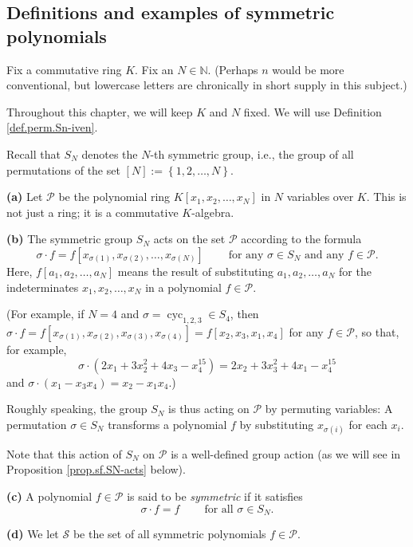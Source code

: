 \subsection{\label{sec.sf.sp}Definitions and examples of symmetric
polynomials}

\begin{convention}
\label{conv.sf.KN}Fix a commutative ring $K$. Fix an $N\in\mathbb{N}$.
(Perhaps $n$ would be more conventional, but lowercase letters are chronically
in short supply in this subject.)

Throughout this chapter, we will keep $K$ and $N$ fixed. We will use
Definition \ref{def.perm.Sn-iven}.
\end{convention}

Recall that $S_{N}$ denotes the $N$-th symmetric group, i.e., the group of all
permutations of the set $\left[  N\right]  :=\left\{  1,2,\ldots,N\right\}  $.

\begin{definition}
\label{def.sf.PS}\textbf{(a)} Let $\mathcal{P}$ be the polynomial ring
$K\left[  x_{1},x_{2},\ldots,x_{N}\right]  $ in $N$ variables over $K$. This
is not just a ring; it is a commutative $K$-algebra. \medskip

\textbf{(b)} The symmetric group $S_{N}$ acts on the set $\mathcal{P}$
according to the formula%
\[
\sigma\cdot f=f\left[  x_{\sigma\left(  1\right)  },x_{\sigma\left(  2\right)
},\ldots,x_{\sigma\left(  N\right)  }\right]  \ \ \ \ \ \ \ \ \ \ \text{for
any }\sigma\in S_{N}\text{ and any }f\in\mathcal{P}.
\]
Here, $f\left[  a_{1},a_{2},\ldots,a_{N}\right]  $ means the result of
substituting $a_{1},a_{2},\ldots,a_{N}$ for the indeterminates $x_{1}%
,x_{2},\ldots,x_{N}$ in a polynomial $f\in\mathcal{P}$.

(For example, if $N=4$ and $\sigma=\operatorname*{cyc}\nolimits_{1,2,3}\in
S_{4}$, then $\sigma\cdot f=f\left[  x_{\sigma\left(  1\right)  }%
,x_{\sigma\left(  2\right)  },x_{\sigma\left(  3\right)  },x_{\sigma\left(
4\right)  }\right]  =f\left[  x_{2},x_{3},x_{1},x_{4}\right]  $ for any
$f\in\mathcal{P}$, so that, for example,%
\[
\sigma\cdot\left(  2x_{1}+3x_{2}^{2}+4x_{3}-x_{4}^{15}\right)  =2x_{2}%
+3x_{3}^{2}+4x_{1}-x_{4}^{15}%
\]
and $\sigma\cdot\left(  x_{1}-x_{3}x_{4}\right)  =x_{2}-x_{1}x_{4}$.)

Roughly speaking, the group $S_{N}$ is thus acting on $\mathcal{P}$ by
permuting variables: A permutation $\sigma\in S_{N}$ transforms a polynomial
$f$ by substituting $x_{\sigma\left(  i\right)  }$ for each $x_{i}$.

Note that this action of $S_{N}$ on $\mathcal{P}$ is a well-defined group
action (as we will see in Proposition \ref{prop.sf.SN-acts} below). \medskip

\textbf{(c)} A polynomial $f\in\mathcal{P}$ is said to be \emph{symmetric} if
it satisfies%
\[
\sigma\cdot f=f\ \ \ \ \ \ \ \ \ \ \text{for all }\sigma\in S_{N}.
\]


\textbf{(d)} We let $\mathcal{S}$ be the set of all symmetric polynomials
$f\in\mathcal{P}$.
\end{definition}

